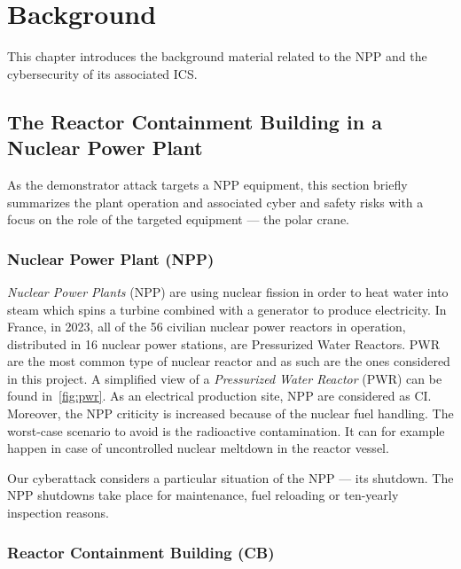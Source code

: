 \chapter{Background}

This chapter introduces the background material related to the NPP and the cybersecurity of its associated ICS.

\section{The Reactor Containment Building in a Nuclear Power Plant}

As the demonstrator attack targets a NPP equipment, this section briefly summarizes the plant operation and associated cyber and safety risks with a focus on the role of the targeted equipment — the polar crane. 

\subsection{Nuclear Power Plant (NPP)}

\emph{Nuclear Power Plants} (NPP) are using nuclear fission in order to heat water into steam which spins a turbine combined with a generator to produce electricity. In France, in 2023, all of the 56 civilian nuclear power reactors in operation, distributed in 16 nuclear power stations, are Pressurized Water Reactors. PWR are the most common type of nuclear reactor and as such are the ones considered in this project. A simplified view of a \emph{Pressurized Water Reactor} (PWR) can be found in~\autoref{fig:pwr}. As an electrical production site, NPP are considered as CI. Moreover, the NPP criticity is increased because of the nuclear fuel handling. The worst-case scenario to avoid is the radioactive contamination. It can for example happen in case of uncontrolled nuclear meltdown in the reactor vessel. 

Our cyberattack considers a particular situation of the NPP — its shutdown. The NPP shutdowns take place for maintenance, fuel reloading or ten-yearly inspection reasons.


\subsection{Reactor Containment Building (CB)}

